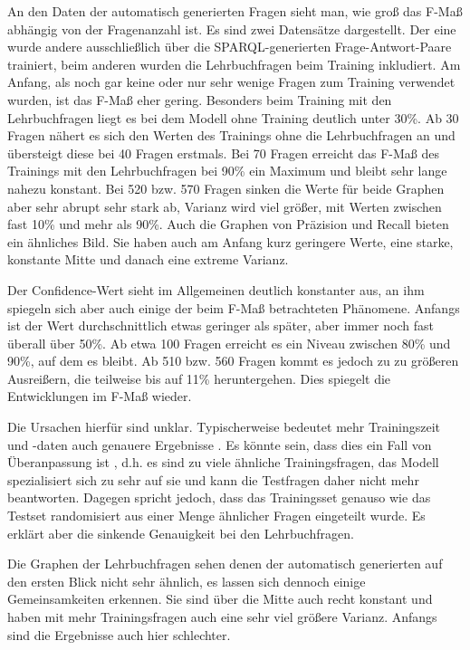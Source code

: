 \documentclass[utf8,biblatex]{lni}
\begin{document}
An den Daten der automatisch generierten Fragen sieht man, wie groß das F-Maß abhängig von der Fragenanzahl ist.
Es sind zwei Datensätze dargestellt.
Der eine wurde andere ausschließlich über die SPARQL-generierten Frage-Antwort-Paare trainiert, beim anderen wurden die Lehrbuchfragen beim Training inkludiert.
Am Anfang, als noch gar keine oder nur sehr wenige Fragen zum Training verwendet wurden, ist das F-Maß eher gering.
Besonders beim Training mit den Lehrbuchfragen liegt es bei dem Modell ohne Training deutlich unter 30\%.
Ab 30 Fragen nähert es sich den Werten des Trainings ohne die Lehrbuchfragen an und übersteigt diese bei 40 Fragen erstmals.
Bei 70 Fragen erreicht das F-Maß des Trainings mit den Lehrbuchfragen bei 90\% ein Maximum und bleibt sehr lange nahezu konstant.
Bei 520 bzw. 570 Fragen sinken die Werte für beide Graphen aber sehr abrupt sehr stark ab, Varianz wird viel größer,
mit Werten zwischen fast 10\% und mehr als 90\%.
Auch die Graphen von Präzision und Recall bieten ein ähnliches Bild.
Sie haben auch am Anfang kurz geringere Werte, eine starke, konstante Mitte und danach eine extreme Varianz.

Der Confidence-Wert sieht im Allgemeinen deutlich konstanter aus, an ihm spiegeln sich aber auch einige der beim F-Maß betrachteten Phänomene.
Anfangs ist der Wert durchschnittlich etwas geringer als später, aber immer noch fast überall über 50\%.
Ab etwa 100 Fragen erreicht es ein Niveau zwischen 80\% und 90\%, auf dem es bleibt.
Ab 510 bzw. 560 Fragen kommt es jedoch zu zu größeren Ausreißern, die teilweise bis auf 11\% heruntergehen.
Dies spiegelt die Entwicklungen im F-Maß wieder.

Die Ursachen hierfür sind unklar.
Typischerweise bedeutet mehr Trainingszeit und -daten auch genauere Ergebnisse \cite{lernkurve}.
Es könnte sein, dass dies ein Fall von Überanpassung ist \cite{overunderfitting}, d.h. es sind zu viele ähnliche Trainingsfragen,
das Modell spezialisiert sich zu sehr auf sie und kann die Testfragen daher nicht mehr beantworten.
Dagegen spricht jedoch, dass das Trainingsset genauso wie das Testset randomisiert aus einer Menge ähnlicher Fragen eingeteilt wurde.
Es erklärt aber die sinkende Genauigkeit bei den Lehrbuchfragen.

Die Graphen der Lehrbuchfragen sehen denen der automatisch generierten auf den ersten Blick nicht sehr ähnlich,
es lassen sich dennoch einige Gemeinsamkeiten erkennen.
Sie sind über die Mitte auch recht konstant und haben mit mehr Trainingsfragen auch eine sehr viel größere Varianz.
Anfangs sind die Ergebnisse auch hier schlechter.
\end{document}
